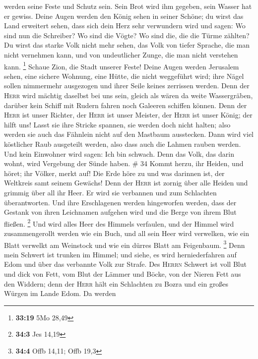 werden seine Feste und Schutz sein. Sein Brot wird ihm gegeben, sein
Wasser hat er gewiss.  Deine Augen werden den König sehen
in seiner Schöne; du wirst das Land erweitert sehen, 
dass sich dein Herz sehr verwundern wird und sagen: Wo sind nun die
Schreiber? Wo sind die Vögte? Wo sind die, die die Türme zählten?
 Du wirst das starke Volk nicht mehr sehen, das Volk von
tiefer Sprache, die man nicht vernehmen kann, und von undeutlicher
Zunge, die man nicht verstehen kann. \footnote{\textbf{33:19} 5Mo 28,49}
 Schaue Zion, die Stadt unserer Feste! Deine Augen werden
Jerusalem sehen, eine sichere Wohnung, eine Hütte, die nicht weggeführt
wird; ihre Nägel sollen nimmermehr ausgezogen und ihrer Seile keines
zerrissen werden.  Denn der \textsc{Herr} wird mächtig
daselbst bei uns sein, gleich als wären da weite Wassergräben, darüber
kein Schiff mit Rudern fahren noch Galeeren schiffen können.
 Denn der \textsc{Herr} ist unser Richter, der
\textsc{Herr} ist unser Meister, der \textsc{Herr} ist unser König; der
hilft uns!  Lasst sie ihre Stricke spannen, sie werden
doch nicht halten; also werden sie auch das Fähnlein nicht auf den
Mastbaum ausstecken. Dann wird viel köstlicher Raub ausgeteilt werden,
also dass auch die Lahmen rauben werden.  Und kein
Einwohner wird sagen: Ich bin schwach. Denn das Volk, das darin wohnt,
wird Vergebung der Sünde haben. \# 34  Kommt herzu, ihr
Heiden, und höret; ihr Völker, merkt auf! Die Erde höre zu und was
darinnen ist, der Weltkreis samt seinem Gewächs!  Denn der
\textsc{Herr} ist zornig über alle Heiden und grimmig über all ihr Heer.
Er wird sie verbannen und zum Schlachten überantworten. 
Und ihre Erschlagenen werden hingeworfen werden, dass der Gestank von
ihren Leichnamen aufgehen wird und die Berge von ihrem Blut fließen.
\footnote{\textbf{34:3} Jes 14,19}  Und wird alles Heer
des Himmels verfaulen, und der Himmel wird zusammengerollt werden wie
ein Buch, und all sein Heer wird verwelken, wie ein Blatt verwelkt am
Weinstock und wie ein dürres Blatt am Feigenbaum. \footnote{\textbf{34:4}
  Offb 14,11; Offb 19,3}  Denn mein Schwert ist trunken im
Himmel; und siehe, es wird herniederfahren auf Edom und über das
verbannte Volk zur Strafe.  Des \textsc{Herrn} Schwert ist
voll Blut und dick von Fett, vom Blut der Lämmer und Böcke, von der
Nieren Fett aus den Widdern; denn der \textsc{Herr} hält ein Schlachten
zu Bozra und ein großes Würgen im Lande Edom.  Da werden
